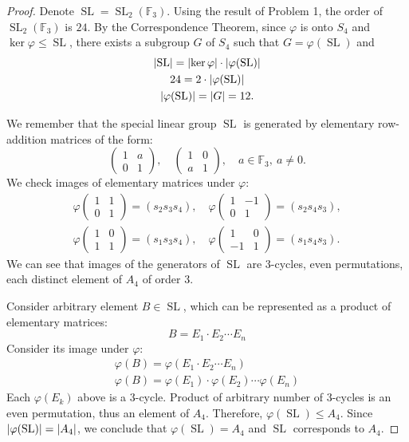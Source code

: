 \documentclass{article}
\theoremstyle{definition}
\newcommand{\F}{\mathbb{F}}
\newcommand{\SL}{\operatorname{SL}}
\DeclarePairedDelimiter\abs{\lvert}{\rvert}
\begin{document}
\begin{proof}
Denote $\SL = \SL_2(\F_3)$.
Using the result of Problem 1, the order of $\SL_2(\F_3)$ is $24$.
By the Correspondence Theorem, since $\varphi$ is onto $S_4$ and $\ker \varphi \leq \SL$, there exists a subgroup $G$ of $S_4$ such that $G = \varphi(\SL)$ and
\begin{gather*}
    \abs{ \SL } = \abs{ \ker \varphi } \cdot \abs{ \varphi(\SL) } \\
    24 = 2 \cdot \abs{ \varphi(\SL) } \\
    \abs{ \varphi(\SL) } = \abs{ G } = 12.
\end{gather*}

We remember that the special linear group $\SL$ is generated by elementary row-addition matrices of the form:
\[
    \begin{pmatrix}
        1 & a \\
        0 & 1
    \end{pmatrix},
    \quad
    \begin{pmatrix}
        1 & 0 \\
        a & 1
    \end{pmatrix},
    \quad a \in \F_3, \> a \neq 0.
\]
We check images of elementary matrices under $\varphi$:
\begin{gather*}
    \varphi
    \begin{pmatrix}
        1 & 1 \\
        0 & 1
    \end{pmatrix} = 
    (s_2 s_3 s_4),
    \quad
    \varphi
    \begin{pmatrix}
        1 & -1 \\
        0 & 1
    \end{pmatrix} = 
    (s_2 s_4 s_3),
    \\
    \varphi
    \begin{pmatrix}
        1 & 0 \\
        1 & 1
    \end{pmatrix} = 
    (s_1 s_3 s_4),
    \quad
    \varphi
    \begin{pmatrix}
        1 & 0 \\
        -1 & 1
    \end{pmatrix} = 
    (s_1 s_4 s_3).
\end{gather*}
We can see that images of the generators of $\SL$ are 3-cycles, even permutations, each distinct element of $A_4$ of order $3$.

Consider arbitrary element $B \in \SL$, which can be represented as a product of elementary matrices:
\[ B = E_1 \cdot E_2 \cdots E_n \]
Consider its image under $\varphi$:
\begin{gather*}
    \varphi(B) = \varphi(E_1 \cdot E_2 \cdots E_n) \\
    \varphi(B) = \varphi(E_1) \cdot \varphi(E_2) \cdots \varphi(E_n)
\end{gather*}
Each $\varphi(E_k)$ above is a 3-cycle.
Product of arbitrary number of 3-cycles is an even permutation, thus an element of $A_4$.
Therefore, $\varphi(\SL) \leq A_4$. Since $\abs{\varphi(\SL)} = \abs{A_4}$, we conclude that $\varphi(\SL) = A_4$ and $\SL$ corresponds to $A_4$.

\end{proof}
\end{document}
